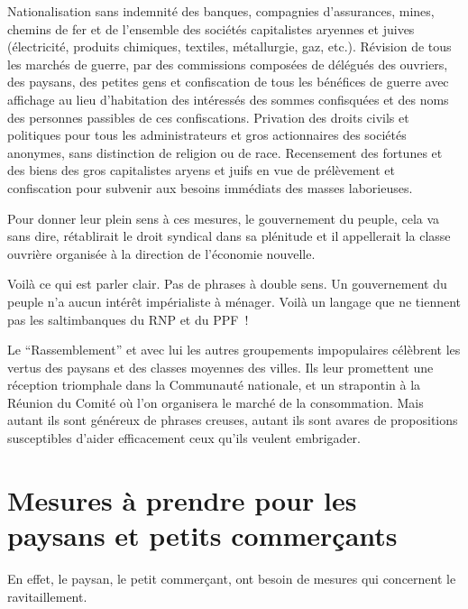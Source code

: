 \documentclass[french,twoside]{book} %
\newcommand{\bibl}[1]{{\RaggedLeft{#1}\par\bigskip}}
\newenvironment{quoteblock}%
  {\begin{quoting}}
  {\end{quoting}}
\newenvironment{quotebar}{%
    \def\FrameCommand{{\color{rubric!10!}\vrule width 0.5em} \hspace{0.9em}}%
    \def\OuterFrameSep{\itemsep} %
    \MakeFramed {\advance\hsize-\width \FrameRestore}
  }%
  {%
    \endMakeFramed
  }
\renewenvironment{quoteblock}%
  {%
    \savenotes
    \setstretch{0.9}
    \normalfont
    \begin{quotebar}
  }
  {%
    \end{quotebar}
    \spewnotes
  }
\begin{document}
\begin{quoteblock}
 \noindent Nationalisation sans indemnité des banques, compagnies d’assurances, mines, chemins de fer et de l’ensemble des sociétés capitalistes aryennes et juives (électricité, produits chimiques, textiles, métallurgie, gaz, etc.). Révision de tous les marchés de guerre, par des commissions composées de délégués des ouvriers, des paysans, des petites gens et confiscation de tous les bénéfices de guerre avec affichage au lieu d’habitation des intéressés des sommes confisquées et des noms des personnes passibles de ces confiscations. Privation des droits civils et politiques pour tous les administrateurs et gros actionnaires des sociétés anonymes, sans distinction de religion ou de race. Recensement des fortunes et des biens des gros capitalistes aryens et juifs en vue de prélèvement et confiscation pour subvenir aux besoins immédiats des masses laborieuses.\par
 
\bibl{(programme du parti communiste).}
 \end{quoteblock}

\noindent Pour donner leur plein sens à ces mesures, le gouvernement du peuple, cela va sans dire, rétablirait le droit syndical dans sa plénitude et il appellerait la classe ouvrière organisée à la direction de l’économie nouvelle.\par
Voilà ce qui est parler clair. Pas de phrases à double sens. Un gouvernement du peuple n’a aucun intérêt impérialiste à ménager. Voilà un langage que ne tiennent pas les saltimbanques du RNP et du PPF !\par
Le “Rassemblement” et avec lui les autres groupements impopulaires célèbrent les vertus des paysans et des classes moyennes des villes. Ils leur promettent une réception triomphale dans la Communauté nationale, et un strapontin à la Réunion du Comité où l’on organisera le marché de la consommation. Mais autant ils sont généreux de phrases creuses, autant ils sont avares de propositions susceptibles d’aider efficacement ceux qu’ils veulent embrigader.
\section[Mesures à prendre pour les paysans et petits commerçants]{Mesures à prendre pour les paysans et petits commerçants}
\noindent En effet, le paysan, le petit commerçant, ont besoin de mesures qui concernent le ravitaillement.\par
\end{document}
